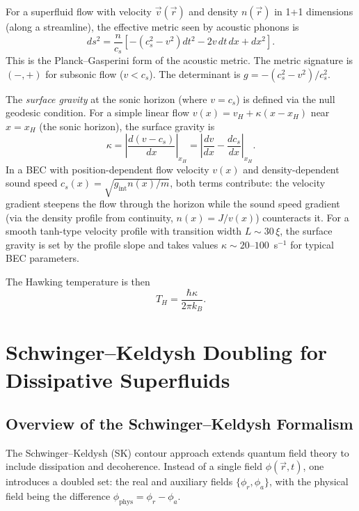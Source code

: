 \documentclass[aps,prl,twocolumn,superscriptaddress,nofootinbib,amsmath,amssymb]{revtex4-2}
\begin{document}
For a superfluid flow with velocity $\vec{v}(\vec{r})$ and density $n(\vec{r})$ in 1+1 dimensions (along a streamline), the effective metric seen by acoustic phonons is \cite{Unruh:1981}
\begin{equation}
\label{eq:acoustic_metric}
ds^2 = \frac{n}{c_s} \left[ -(c_s^2 - v^2) dt^2 - 2v \, dt \, dx + dx^2 \right].
\end{equation}
This is the Planck--Gasperini form of the acoustic metric. The metric signature is $(-,+)$ for subsonic flow ($v < c_s$). The determinant is $g = -(c_s^2 - v^2)/c_s^2$.

The \emph{surface gravity} at the sonic horizon (where $v = c_s$) is defined via the null geodesic condition. For a simple linear flow $v(x) = v_H + \kappa (x - x_H)$ near $x = x_H$ (the sonic horizon), the surface gravity is
\begin{equation}
\label{eq:surface_gravity}
\kappa = \left|\frac{d(v - c_s)}{dx}\right|_{x_H} = \left|\frac{dv}{dx} - \frac{dc_s}{dx}\right|_{x_H}.
\end{equation}
In a BEC with position-dependent flow velocity $v(x)$ and density-dependent sound speed $c_s(x) = \sqrt{g_{\text{int}} n(x)/m}$, both terms contribute: the velocity gradient steepens the flow through the horizon while the sound speed gradient (via the density profile from continuity, $n(x) = J/v(x)$) counteracts it. For a smooth tanh-type velocity profile with transition width $L \sim 30\,\xi$, the surface gravity is set by the profile slope and takes values $\kappa \sim 20$--$100$~s$^{-1}$ for typical BEC parameters.

The Hawking temperature is then
\begin{equation}
\label{eq:hawking_temp}
T_H = \frac{\hbar \kappa}{2\pi k_B}.
\end{equation}

\section{Schwinger--Keldysh Doubling for Dissipative Superfluids}
\label{sec:sk}

\subsection{Overview of the Schwinger--Keldysh Formalism}

The Schwinger--Keldysh (SK) contour approach extends quantum field theory to include dissipation and decoherence. Instead of a single field $\phi(\vec{r}, t)$, one introduces a doubled set: the real and auxiliary fields $\{\phi_r, \phi_a\}$, with the physical field being the difference $\phi_{\text{phys}} = \phi_r - \phi_a$.
\end{document}
